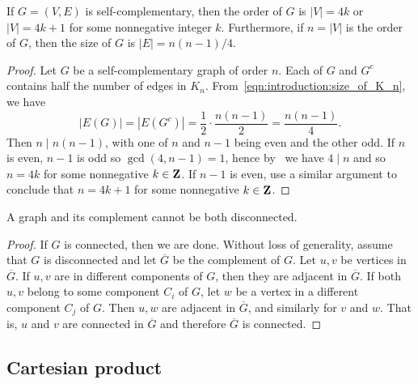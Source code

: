 \begin{theorem}
If $G = (V, E)$ is self-complementary, then the order of $G$ is
$|V| = 4k$ or $|V| = 4k + 1$ for some nonnegative integer
$k$. Furthermore, if $n = |V|$ is the order of $G$, then the size of
$G$ is $|E| = n(n - 1) / 4$.
\end{theorem}

\begin{proof}
Let $G$ be a self-complementary graph of order $n$. Each of $G$ and
$G^c$ contains half the number of edges in
$K_n$. From~\eqref{eqn:introduction:size_of_K_n}, we have
\[
|E(G)|
=
|E(G^c)|
=
\frac{1}{2} \cdot \frac{n(n - 1)}{2}
=
\frac{n(n - 1)}{4}.
\]
Then $n \;|\; n(n - 1)$, with one of $n$ and $n - 1$ being even and
the other odd. If $n$ is even, $n - 1$ is odd so $\gcd(4, n-1) = 1$,
hence by~\cite[Theorem~1.9]{Shoup2008} we have $4 \;|\; n$ and so
$n = 4k$ for some nonnegative $k \in \mathbf{Z}$. If $n - 1$ is even, use a
similar argument to conclude that $n = 4k + 1$ for some nonnegative
$k \in \mathbf{Z}$.
\end{proof}

\begin{theorem}
A graph and its complement cannot be both disconnected.
\end{theorem}

\begin{proof}
If $G$ is connected, then we are done. Without loss of generality,
assume that $G$ is disconnected and let $\overline{G}$ be the
complement of $G$. Let $u,v$ be vertices in $\overline{G}$. If $u,v$
are in different components of $G$, then they are adjacent in
$\overline{G}$. If both $u,v$ belong to some component $C_i$ of $G$,
let $w$ be a vertex in a different component $C_j$ of $G$. Then $u,w$
are adjacent in $\overline{G}$, and similarly for $v$ and $w$. That is,
$u$ and $v$ are connected in $\overline{G}$ and therefore $\overline{G}$
is connected.
\end{proof}



\subsection{Cartesian product}

